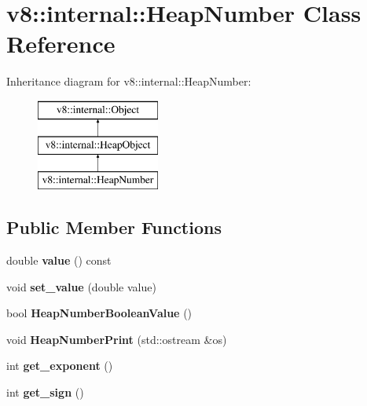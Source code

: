 \hypertarget{classv8_1_1internal_1_1_heap_number}{}\section{v8\+:\+:internal\+:\+:Heap\+Number Class Reference}
\label{classv8_1_1internal_1_1_heap_number}
Inheritance diagram for v8\+:\+:internal\+:\+:Heap\+Number\+:\begin{figure}[H]
\begin{center}
\leavevmode
\includegraphics[height=3.000000cm]{classv8_1_1internal_1_1_heap_number}
\end{center}
\end{figure}
\subsection*{Public Member Functions}
\begin{DoxyCompactItemize}
\item 
double {\bfseries value} () const \hypertarget{classv8_1_1internal_1_1_heap_number_a9d64b2e3b1c243fad7d9217ec63e4f6e}{}\label{classv8_1_1internal_1_1_heap_number_a9d64b2e3b1c243fad7d9217ec63e4f6e}

\item 
void {\bfseries set\+\_\+value} (double value)\hypertarget{classv8_1_1internal_1_1_heap_number_ac6726d8db750c4b11885a6b6e724f640}{}\label{classv8_1_1internal_1_1_heap_number_ac6726d8db750c4b11885a6b6e724f640}

\item 
bool {\bfseries Heap\+Number\+Boolean\+Value} ()\hypertarget{classv8_1_1internal_1_1_heap_number_a2d2c0f1c6b28629c46aea753d3bb0bb6}{}\label{classv8_1_1internal_1_1_heap_number_a2d2c0f1c6b28629c46aea753d3bb0bb6}

\item 
void {\bfseries Heap\+Number\+Print} (std\+::ostream \&os)\hypertarget{classv8_1_1internal_1_1_heap_number_a505e3c19a10517e2743a51f28be2bbfa}{}\label{classv8_1_1internal_1_1_heap_number_a505e3c19a10517e2743a51f28be2bbfa}

\item 
int {\bfseries get\+\_\+exponent} ()\hypertarget{classv8_1_1internal_1_1_heap_number_a90729bf6ec40a432cace27186f005584}{}\label{classv8_1_1internal_1_1_heap_number_a90729bf6ec40a432cace27186f005584}

\item 
int {\bfseries get\+\_\+sign} ()\hypertarget{classv8_1_1internal_1_1_heap_number_abef98f476e59d21c329250c98330d986}{}\label{classv8_1_1internal_1_1_heap_number_abef98f476e59d21c329250c98330d986}

\end{DoxyCompactItemize}
